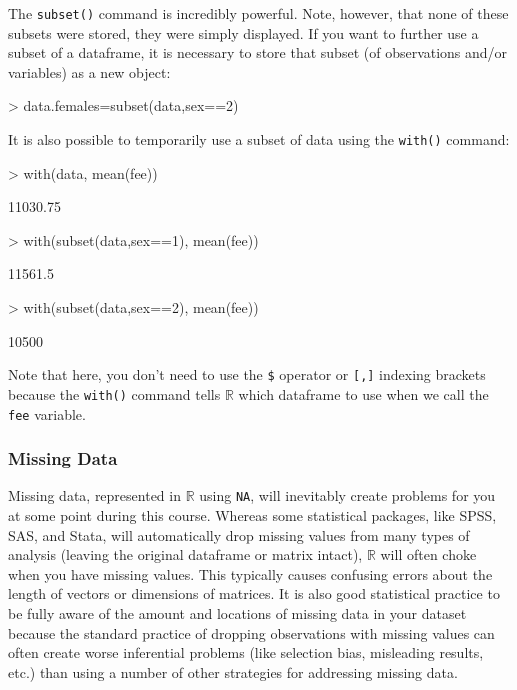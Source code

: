 \documentclass[12pt]{article}
\begin{document}
The \verb|subset()| command is incredibly powerful. Note, however, that none of these subsets were stored, they were simply displayed. If you want to further use a subset of a dataframe, it is necessary to store that subset (of observations and/or variables) as a new object:
\begin{Schunk}
\begin{Sinput}
> data.females=subset(data,sex==2)
\end{Sinput}
\end{Schunk}

It is also possible to temporarily use a subset of data using the \verb|with()| command:
\begin{Schunk}
\begin{Sinput}
> with(data, mean(fee))
\end{Sinput}
\begin{Soutput}
[1] 11030.75
\end{Soutput}
\begin{Sinput}
> with(subset(data,sex==1), mean(fee))
\end{Sinput}
\begin{Soutput}
[1] 11561.5
\end{Soutput}
\begin{Sinput}
> with(subset(data,sex==2), mean(fee))
\end{Sinput}
\begin{Soutput}
[1] 10500
\end{Soutput}
\end{Schunk}
Note that here, you don't need to use the \verb|$| operator or \verb|[,]| indexing brackets because the \verb|with()| command tells $\mathbb{R}$ which dataframe to use when we call the \verb|fee| variable.

\subsubsection{Missing Data}
Missing data, represented in $\mathbb{R}$ using \verb|NA|, will inevitably create problems for you at some point during this course. Whereas some statistical packages, like SPSS, SAS, and Stata, will automatically drop missing values from many types of analysis (leaving the original dataframe or matrix intact), $\mathbb{R}$ will often choke when you have missing values. This typically causes confusing errors about the length of vectors or dimensions of matrices. It is also good statistical practice to be fully aware of the amount and locations of missing data in your dataset because the standard practice of dropping observations with missing values can often create worse inferential problems (like selection bias, misleading results, etc.) than using a number of other strategies for addressing missing data.
\end{document}
